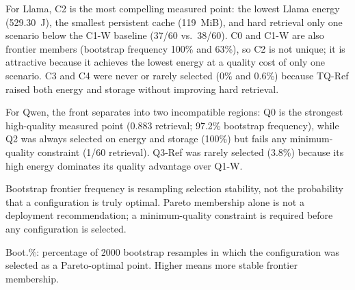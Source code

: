 \documentclass[sigconf,nonacm]{acmart}
\begin{document}
For Llama, C2 is the most compelling measured point: the lowest Llama energy
(529.30~J), the smallest persistent cache (119~MiB), and hard retrieval only one
scenario below the C1-W baseline (37/60 vs.\ 38/60). C0 and C1-W are also
frontier members (bootstrap frequency 100\% and 63\%), so C2 is not unique; it
is attractive because it achieves the lowest energy at a quality cost of only one
scenario. C3 and C4 were never or rarely selected (0\% and 0.6\%) because TQ-Ref
raised both energy and storage without improving hard retrieval.

For Qwen, the front separates into two incompatible regions: Q0 is the strongest
high-quality measured point (0.883 retrieval; 97.2\% bootstrap frequency), while
Q2 was always selected on energy and storage (100\%) but fails any minimum-quality
constraint (1/60 retrieval). Q3-Ref was rarely selected (3.8\%) because its high
energy dominates its quality advantage over Q1-W.

Bootstrap frontier frequency is resampling selection stability, not the probability
that a configuration is truly optimal. Pareto membership alone is not a deployment
recommendation; a minimum-quality constraint is required before any configuration
is selected.

\begin{table}[htbp]
\caption{Three-Objective Pareto Frontier at 4096 Tokens (2000 Bootstrap Resamples)}
\label{tab:pareto3}
\centering\small
{}
\begin{minipage}{\columnwidth}\vspace{2pt}\footnotesize
Boot.\%: percentage of 2000 bootstrap resamples in which the configuration was
selected as a Pareto-optimal point. Higher means more stable frontier membership.
\end{minipage}
\end{table}
\end{document}
